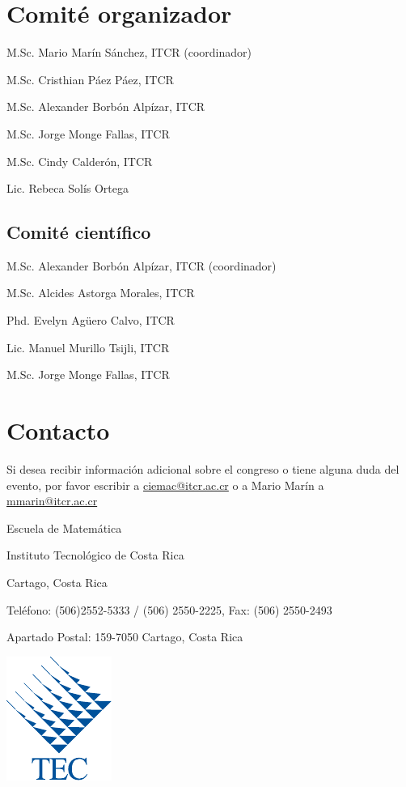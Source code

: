 \documentclass[10pt, notumble, letterpaper]{leaflet}
\begin{document}
\section{Comité organizador}

M.Sc. Mario Marín Sánchez, ITCR (coordinador)

M.Sc. Cristhian Páez Páez, ITCR

M.Sc. Alexander Borbón Alpízar, ITCR

M.Sc. Jorge Monge Fallas, ITCR

M.Sc. Cindy Calderón, ITCR

Lic. Rebeca Solís Ortega


\subsection{Comité científico}

M.Sc. Alexander Borbón Alpízar, ITCR (coordinador)

M.Sc. Alcides Astorga Morales, ITCR

Phd. Evelyn Agüero Calvo, ITCR

Lic. Manuel Murillo Tsijli, ITCR

M.Sc. Jorge Monge Fallas, ITCR

\newpage



\section{\vfill Contacto}

Si desea recibir información adicional sobre el congreso o tiene alguna duda del evento, por favor escribir a \url{ciemac@itcr.ac.cr} o a Mario Marín a \url{mmarin@itcr.ac.cr}

Escuela de Matemática

Instituto Tecnológico de Costa Rica

Cartago, Costa Rica

Teléfono: (506)2552-5333 / (506) 2550-2225, Fax: (506) 2550-2493

Apartado Postal: 159-7050 Cartago, Costa Rica

\vspace{1cm}

\begin{center}
\includegraphics[scale=1]{LogoTEC}
\end{center}
\end{document}
